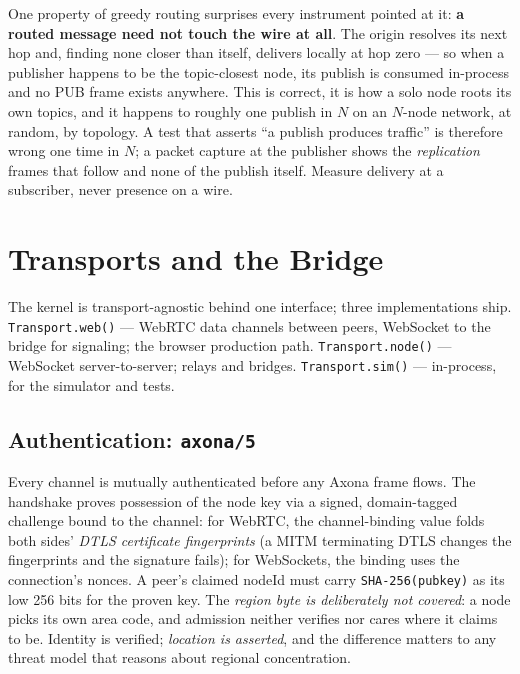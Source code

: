 \documentclass[nobib]{tufte-handout}
\begin{document}
One property of greedy routing surprises every instrument pointed at
it: \textbf{a routed message need not touch the wire at all}. The
origin resolves its next hop and, finding none closer than itself,
delivers locally at hop zero --- so when a publisher happens to be the
topic-closest node, its publish is consumed in-process and no PUB frame
exists anywhere. This is correct, it is how a solo node roots its own
topics, and it happens to roughly one publish in $N$ on an $N$-node
network, at random, by topology. A test that asserts ``a publish
produces traffic'' is therefore wrong one time in $N$; a packet capture
at the publisher shows the \emph{replication} frames that follow and
none of the publish itself. Measure delivery at a subscriber, never
presence on a wire.

\section{Transports and the Bridge}\label{sec:transport}

The kernel is transport-agnostic behind one interface; three
implementations ship. \texttt{Transport.web()} --- WebRTC data channels
between peers, WebSocket to the bridge for signaling; the browser
production path. \texttt{Transport.node()} --- WebSocket server-to-server;
relays and bridges. \texttt{Transport.sim()} --- in-process, for the
simulator and tests.

\subsection{Authentication: \texttt{axona/5}}

Every channel is mutually authenticated before any Axona frame flows.
The handshake proves possession of the node key via a signed,
domain-tagged challenge bound to the channel: for WebRTC, the
channel-binding value folds both sides' \emph{DTLS certificate
fingerprints} (a MITM terminating DTLS changes the fingerprints and the
signature fails); for WebSockets, the binding uses the connection's
nonces. A peer's claimed nodeId must carry \texttt{SHA-256(pubkey)} as its
low 256 bits for the proven key. The \emph{region byte is deliberately
not covered}: a node picks its own area code, and admission neither
verifies nor cares where it claims to be. Identity is verified;
\emph{location is asserted}, and the difference matters to any threat
model that reasons about regional concentration.
\end{document}
